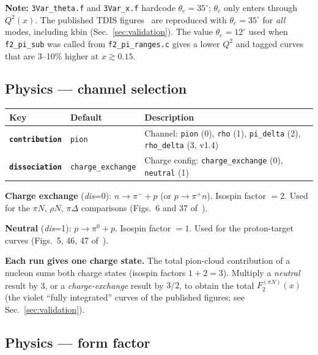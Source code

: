 \documentclass[11pt,a4paper]{article}
\newcommand{\inikey}[1]{\texttt{\textbf{#1}}}
\begin{document}
\textbf{Note:} \texttt{3Var\_theta.f} and \texttt{3Var\_x.f} hardcode
$\theta_e = 35^{\circ}$; $\theta_e$ only enters through $Q^2(x)$.
The published TDIS figures~\cite{TDIS15} are reproduced with
$\theta_e = 35^{\circ}$ for \emph{all} modes, including kbin
(Sec.~\ref{sec:validation}).  The value $\theta_e = 12^{\circ}$ used when
\texttt{f2\_pi\_sub} was called from \texttt{f2\_pi\_ranges.c} gives a lower
$Q^2$ and tagged curves that are 3--10\% higher at $x\gtrsim0.15$.

\subsection{Physics --- channel selection}

\begin{center}
\begin{tabular}{llp{7.2cm}}
\toprule
\textbf{Key} & \textbf{Default} & \textbf{Description} \\
\midrule
\inikey{contribution} & \texttt{pion}
  & Channel: \texttt{pion} (0), \texttt{rho} (1), \texttt{pi\_delta} (2), \texttt{rho\_delta} (3, v1.4) \\
\inikey{dissociation}  & \texttt{charge\_exchange}
  & Charge config: \texttt{charge\_exchange} (0), \texttt{neutral} (1) \\
\bottomrule
\end{tabular}
\end{center}

\textbf{Charge exchange} (\textit{dis}=0): $n \to \pi^- + p$
(or $p\to\pi^+ n$).  Isospin factor $= 2$.  Used for the
$\pi N$, $\rho N$, $\pi\Delta$ comparisons (Figs.~6 and 37 of~\cite{TDIS15}).

\textbf{Neutral} (\textit{dis}=1): $p \to \pi^0 + p$.
Isospin factor $= 1$.  Used for the proton-target curves
(Figs.~5, 46, 47 of~\cite{TDIS15}).

\textbf{Each run gives one charge state.}  The total pion-cloud
contribution of a nucleon sums both charge states (isospin factors
$1+2=3$).  Multiply a \emph{neutral} result by 3, or a
\emph{charge-exchange} result by $3/2$, to obtain the total
$F_2^{(\pi N)}(x)$ (the violet ``fully integrated'' curves of the
published figures; see Sec.~\ref{sec:validation}).

\subsection{Physics --- form factor}
\end{document}
